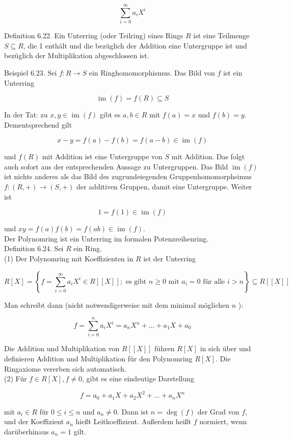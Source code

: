 \documentclass[10pt, letterpaper]{article}
\begin{document}
$$
\sum_{i=0}^{\infty} a_{i} X^{i}
$$

Definition 6.22. Ein Unterring (oder Teilring) eines Rings $R$ ist eine Teilmenge $S \subseteq R$, die 1 enthält und die bezüglich der Addition eine Untergruppe ist und bezüglich der Multiplikation abgeschlossen ist.

Beispiel 6.23. Sei $f: R \rightarrow S$ ein Ringhomomorphismus. Das Bild von $f$ ist ein Unterring

$$
\operatorname{im}(f)=f(R) \subseteq S
$$

In der Tat: zu $x, y \in \operatorname{im}(f)$ gibt es $a, b \in R$ mit $f(a)=x$ und $f(b)=y$. Dementsprechend gilt

$$
x-y=f(a)-f(b)=f(a-b) \in \operatorname{im}(f)
$$

und $f(R)$ mit Addition ist eine Untergruppe von $S$ mit Addition. Das folgt auch sofort aus der entsprechenden Aussage zu Untergruppen. Das Bild $\operatorname{im}(f)$ ist nichts anderes als das Bild des zugrundeiegenden Gruppenhomomorphsimus $f:(R,+) \rightarrow(S,+)$ der additiven Gruppen, damit eine Untergruppe. Weiter ist

$$
1=f(1) \in \operatorname{im}(f)
$$

und $x y=f(a) f(b)=f(a b) \in \operatorname{im}(f)$.\\
Der Polynomring ist ein Unterring im formalen Potenzreihenring.\\
Definition 6.24. Sei $R$ ein Ring.\\
(1) Der Polynomring mit Koeffizienten in $R$ ist der Unterring

$$
R[X]=\left\{f=\sum_{i=0}^{\infty} a_{i} X^{i} \in R[[X]] ; \text { es gibt } n \geq 0 \text { mit } a_{i}=0 \text { für alle } i>n\right\} \subseteq R[[X]]
$$

Man schreibt dann (nicht notwendigerweise mit dem minimal möglichen $n$ ):

$$
f=\sum_{i=0}^{n} a_{i} X^{i}=a_{n} X^{n}+\ldots+a_{1} X+a_{0}
$$

Die Addition und Multiplikation von $R[[X]]$ führen $R[X]$ in sich über und definieren Addition und Multiplikation für den Polynomring $R[X]$. Die Ringaxiome vererben sich automatisch.\\
(2) Für $f \in R[X], f \neq 0$, gibt es eine eindeutige Darstellung

$$
f=a_{0}+a_{1} X+a_{2} X^{2}+\ldots+a_{n} X^{n}
$$

mit $a_{i} \in R$ für $0 \leq i \leq n$ und $a_{n} \neq 0$. Dann ist $n=\operatorname{deg}(f)$ der Grad von $f$, und der Koeffizient $a_{n}$ hießt Leitkoeffizient. Außerdem heißt $f$ normiert, wenn darüberhinaus $a_{n}=1$ gilt.
\end{document}
